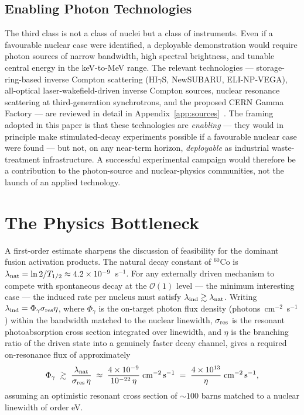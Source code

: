 \documentclass[conference]{IEEEtran}
\begin{document}
\subsection{Enabling Photon Technologies}
The third class is not a class of nuclei but a class of instruments. Even if a favourable nuclear case were identified, a deployable demonstration would require photon sources of narrow bandwidth, high spectral brightness, and tunable central energy in the keV-to-MeV range. The relevant technologies --- storage-ring-based inverse Compton scattering (HI$\gamma$S, NewSUBARU, ELI-NP-VEGA), all-optical laser-wakefield-driven inverse Compton sources, nuclear resonance scattering at third-generation synchrotrons, and the proposed CERN Gamma Factory --- are reviewed in detail in Appendix~\ref{app:sources}~\cite{weller2009higs,balabanski2018elinp,krasny2015gammafactory,esarey2009lwfa,powers2014allopticalics,chumakov2018narrow}. The framing adopted in this paper is that these technologies are \emph{enabling} --- they would in principle make stimulated-decay experiments possible if a favourable nuclear case were found --- but not, on any near-term horizon, \emph{deployable} as industrial waste-treatment infrastructure. A successful experimental campaign would therefore be a contribution to the photon-source and nuclear-physics communities, not the launch of an applied technology.

\section{The Physics Bottleneck}
\label{sec:bottleneck}
A first-order estimate sharpens the discussion of feasibility for the dominant fusion activation products. The natural decay constant of $^{60}$Co is $\lambda_{\rm nat} = \ln 2 / T_{1/2} \approx 4.2 \times 10^{-9}$~s$^{-1}$. For any externally driven mechanism to compete with spontaneous decay at the $\mathcal{O}(1)$ level --- the minimum interesting case --- the induced rate per nucleus must satisfy $\lambda_{\rm ind} \gtrsim \lambda_{\rm nat}$. Writing $\lambda_{\rm ind} = \Phi_\gamma \sigma_{\rm res} \eta$, where $\Phi_\gamma$ is the on-target photon flux density (photons~cm$^{-2}$~s$^{-1}$) within the bandwidth matched to the nuclear linewidth, $\sigma_{\rm res}$ is the resonant photoabsorption cross section integrated over linewidth, and $\eta$ is the branching ratio of the driven state into a genuinely faster decay channel, gives a required on-resonance flux of approximately
\begin{equation}
\Phi_\gamma \;\gtrsim\; \frac{\lambda_{\rm nat}}{\sigma_{\rm res}\,\eta} \;\approx\; \frac{4 \times 10^{-9}}{10^{-22}\,\eta}\;\mathrm{cm^{-2}\,s^{-1}} \;=\; \frac{4 \times 10^{13}}{\eta}\;\mathrm{cm^{-2}\,s^{-1}},
\end{equation}
assuming an optimistic resonant cross section of $\sim 100$ barns matched to a nuclear linewidth of order eV.
\end{document}

